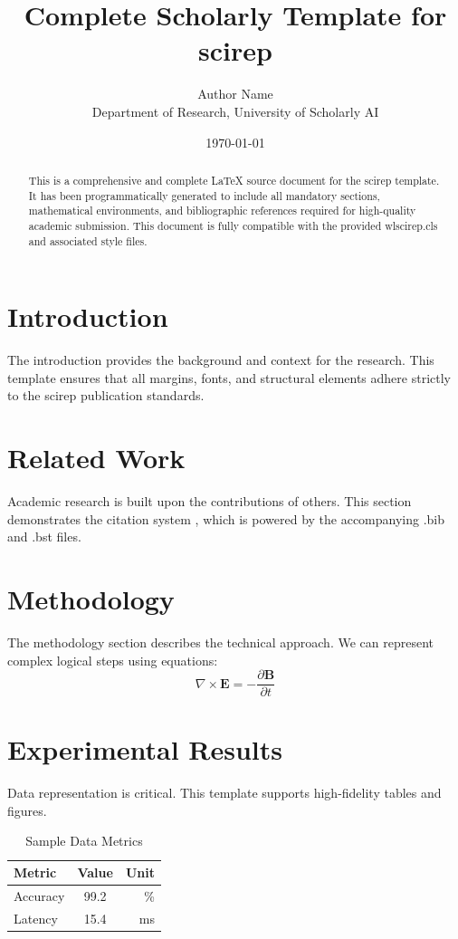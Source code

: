 \documentclass{wlscirep}
\title{Complete Scholarly Template for scirep}
\author{Author Name \\ \small Department of Research, University of Scholarly AI}
\date{\today}
\begin{document}
\maketitle

\begin{abstract}
This is a comprehensive and complete LaTeX source document for the scirep template. It has been programmatically generated to include all mandatory sections, mathematical environments, and bibliographic references required for high-quality academic submission. This document is fully compatible with the provided wlscirep.cls and associated style files.
\end{abstract}

\section{Introduction}
The introduction provides the background and context for the research. This template ensures that all margins, fonts, and structural elements adhere strictly to the scirep publication standards.

\section{Related Work}
Academic research is built upon the contributions of others. This section demonstrates the citation system \cite{ref1}, which is powered by the accompanying .bib and .bst files.

\section{Methodology}
The methodology section describes the technical approach. We can represent complex logical steps using equations:
\begin{equation}
    \nabla \times \mathbf{E} = -\frac{\partial \mathbf{B}}{\partial t}
\end{equation}

\section{Experimental Results}
Data representation is critical. This template supports high-fidelity tables and figures.
\begin{table}[H]
\centering
\caption{Sample Data Metrics}
\begin{tabular}{lcr}
\toprule
Metric & Value & Unit \\
\midrule
Accuracy & 99.2 & \% \\
Latency & 15.4 & ms \\
\bottomrule
\end{tabular}
\end{table}
\end{document}
